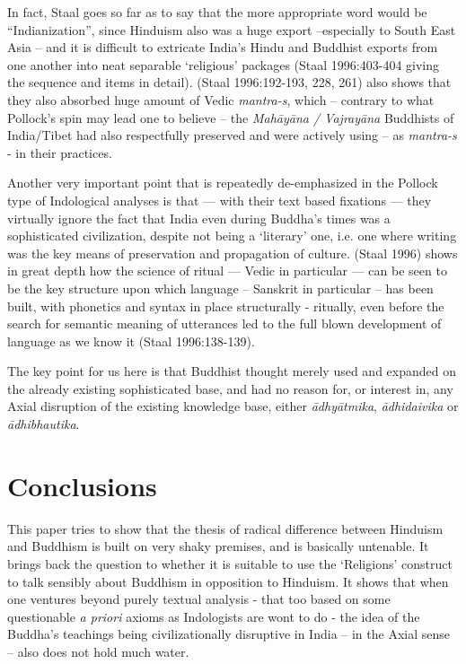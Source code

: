 In fact, Staal goes so far as to say that the more appropriate word would be “Indianization”, since Hinduism also was a huge export –especially to South East Asia – and it is difficult to extricate India’s Hindu and Buddhist exports from one another into neat separable ‘religious’ packages (Staal 1996:403-404 giving the sequence and items in detail). (Staal 1996:192-193, 228, 261) also shows that they also absorbed huge amount of Vedic \textit{mantra-s}, which – contrary to what Pollock’s spin may lead one to believe – the \textit{Mahāyāna / Vajrayāna} Buddhists of India/Tibet had also respectfully preserved and were actively using – as \textit{mantra-s} - in their practices.

Another very important point that is repeatedly de-emphasized in the Pollock type of Indological analyses is that --- with their text based fixations --- they virtually ignore the fact that India even during Buddha’s times was a sophisticated civilization, despite not being a ‘literary’ one, i.e. one where writing was the key means of preservation and propagation of culture. (Staal 1996) shows in great depth how the science of ritual --- Vedic in particular --- can be seen to be the key structure upon which language – Sanskrit in particular – has been built, with phonetics and syntax in place structurally - ritually, even before the search for semantic meaning of utterances led to the full blown development of language as we know it (Staal 1996:138-139).

The key point for us here is that Buddhist thought merely used and expanded on the already existing sophisticated base, and had no reason for, or interest in, any Axial disruption of the existing knowledge base, either \textit{ādhyātmika}, \textit{ādhidaivika} or\textit{ ādhibhautika}.

\vspace{-.3cm}

\section*{Conclusions}

This paper tries to show that the thesis of radical difference between Hinduism and Buddhism is built on very shaky premises, and is basically untenable. It brings back the question to whether it is suitable to use the ‘Religions’ construct to talk sensibly about Buddhism in opposition to Hinduism. It shows that when one ventures beyond purely textual analysis - that too based on some questionable \textit{a priori} axioms as Indologists are wont to do - the idea of the Buddha’s teachings being civilizationally disruptive in India – in the Axial sense – also does not hold much water.

